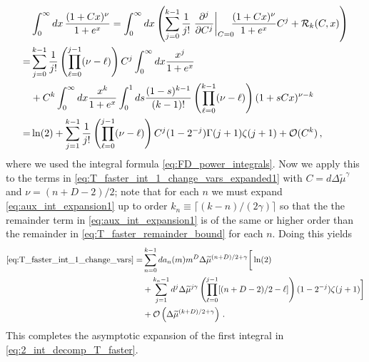\documentclass[sn-mathphys,Numbered]{sn-jnl}
\begin{document}
\begin{align}\label{eq:aux_int_expansion1}
&\int_0^\infty dx\, \frac{(1+C x)^\nu}{1+e^x} = \int_0^\infty dx\left(\sum_{j=0}^{k-1} \frac{1}{j!} \left.\frac{\partial^j}{\partial C^j}\right|_{C=0}\!\!\! \frac{(1+Cx)^\nu}{1 + e^x} C^j + \mathcal{R}_k(C,x)\right)\\
=&\sum_{j=0}^{k-1}\frac{1}{j!} \left(\prod_{\ell=0}^{j-1}(\nu-\ell) \right)C^j\int_0^\infty dx\frac{x^j}{1+e^x} \notag\\
&+C^k\int_0^\infty dx \frac{x^k}{1+e^x} \int_0^1 ds\frac{(1-s)^{k-1}}{(k-1)!}  \left(\prod_{\ell=0}^{k-1}(\nu-\ell)\right)(1+sCx)^{\nu-k}\notag\\
=&\ln(2)+\sum_{j=1}^{k-1}\frac{1}{j!} \left(\prod_{\ell=0}^{j-1}(\nu-\ell) \right)C^j  (1 - 2^{-j}) \Gamma(j+1) \zeta(j+1) +\mathcal{O}(C^k)\,, \notag
\end{align}
where  we used the integral formula \eqref{eq:FD_power_integrals}. Now we apply this to the terms in \eqref{eq:T_faster_int_1_change_vars_expanded1} with $C=d\Delta\widetilde{\mu}^\gamma$ and $\nu=(n+D-2)/2$; note that for each $n$ we must expand \eqref{eq:aux_int_expansion1} up to order $k_n\equiv\lceil(k-n)/(2\gamma)\rceil$ so that the the remainder term in \eqref{eq:aux_int_expansion1} is of  the same or higher order than the remainder in \eqref{eq:T_faster_remainder_bound} for each $n$. Doing this yields
\begin{align}\label{eq:T_faster_int_1_change_vars_expanded2}
\eqref{eq:T_faster_int_1_change_vars} =& \sum_{n=0}^{k-1} da_n(m)m^{D}\Delta\widetilde{\mu}^{(n+D)/2+\gamma}\bigg[
\ln(2)\\
&+\sum_{j=1}^{k_n-1}d^j\Delta\widetilde{\mu}^{j\gamma}  \left(\prod_{\ell=0}^{j-1}[(n+D-2)/2-\ell] \right) (1 - 2^{-j})  \zeta(j+1)\bigg]\notag
\\
&+\mathcal{O}\left(\Delta\widetilde{\mu}^{(k+D)/2+\gamma}\right)\,.\notag
\end{align}
This completes the asymptotic expansion of the first integral in  \eqref{eq:2_int_decomp_T_faster}.
\end{document}
